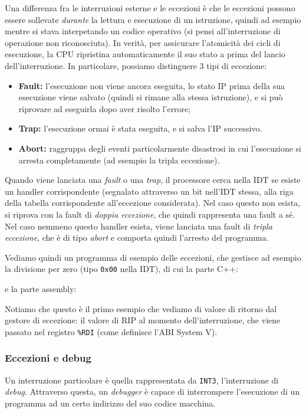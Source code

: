 \documentclass[a4paper,11pt]{article}
\begin{document}
Una differenza fra le interruzioni esterne e le eccezioni è che le eccezioni possono essere sollevate \textit{durante} la lettura e esecuzione di un istruzione, quindi ad esempio mentre si stava interpetando un codice operativo (si pensi all'interruzione di operazione non riconosciuta).
In verità, per assicurare l'atomicità dei cicli di esecuzione, la CPU ripristina automaticamente il suo stato a prima del lancio dell'interruzione.
In particolare, possiamo distinguere 3 tipi di eccezione:
\begin{itemize}
	\item \textbf{Fault:} l'esecuzione non viene ancora eseguita, lo stato IP prima della sua esecuzione viene salvato (quindi si rimane alla stessa istruzione), e si può riprovare ad eseguirla dopo aver risolto l'errore;
	\item \textbf{Trap:} l'esecuzione ormai è stata eseguita, e si salva l'IP successivo.
	\item \textbf{Abort:} raggruppa degli eventi particolarmente disastrosi in cui l'esecuzione si arresta completamente (ad esempio la tripla eccezione).
\end{itemize}

Quando viene lanciata una \textit{fault} o una \textit{trap}, il processore cerca nella IDT se esiste un handler corrispondente (segnalato attraverso un bit nell'IDT stessa, alla riga della tabella corrispondente all'eccezione considerata).
Nel caso questo non esista, si riprova con la fault di \textit{doppia eccezione}, che quindi rappresenta una fault a sé.
Nel caso nemmeno questo handler esista, viene lanciata una fault di \textit{tripla eccezione}, che è di tipo \textit{abort} e comporta quindi l'arresto del programma.

\par\medskip

Vediamo quindi un programma di esempio delle eccezioni, che gestisce ad esempio la divisione per zero (tipo \lstinline|0x00| nella IDT), di cui la parte C++:
\lstset{style=codestyle, language=C++}

e la parte assembly:
\lstset{style=codestyle, language=assembler}


Notiamo che questo è il primo esempio che vediamo di valore di ritorno dal gestore di eccezione: il valore di RIP al momento dell'interruzione, che viene passato nel registro \lstinline|%RDI| (come definisce l'ABI System V).

\subsubsection{Eccezioni e debug}
Un interruzione particolare è quella rappresentata da \lstinline|INT3|, l'interruzione di \textit{debug}.
Attraverso questa, un \textit{debugger} è capace di interrompere l'esecuzione di un programma ad un certo indirizzo del suo codice macchina.
\end{document}
